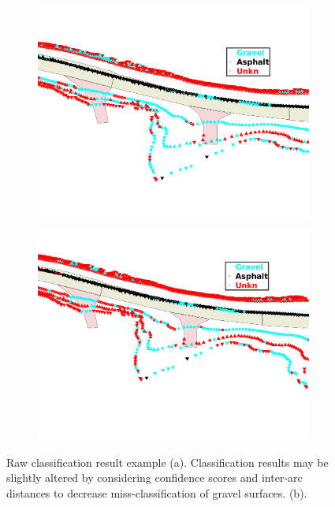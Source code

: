 \documentclass[journal,onecolumn]{IEEEtran}
\begin{document}
	\begin{figure}[H]
			\centering
			\begin{subfigure}{0.495\textwidth}
					\centering
					\includegraphics[width=0.95\linewidth]{figures/pre-adjust}
					\caption[Pre-Adjusted]{}
					\label{fig:pre-adjust}	
				\end{subfigure}
			\begin{subfigure}{0.495\textwidth}
					\centering
					\includegraphics[width=0.95\linewidth]{figures/post-adjust}
					\caption[Post-Adjusted]{}
					\label{fig:post-adjust}
				\end{subfigure}
				\label{fig:pre_post_adjust}
				\caption[Post-Adjusted]{Raw classification result example (a). Classification results may be slightly altered by considering confidence scores and inter-arc distances to decrease miss-classification of gravel surfaces. (b).}
	\end{figure}
	
\end{document}
